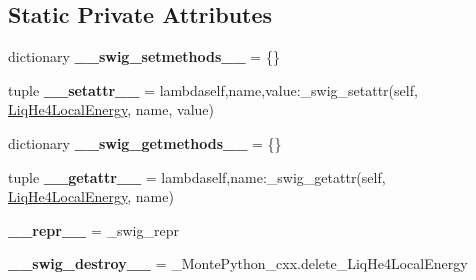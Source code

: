 \subsection*{Static Private Attributes}
\begin{DoxyCompactItemize}
\item 
\hypertarget{classMontePython__cxx_1_1LiqHe4LocalEnergy_a29a3839abb7b7cff3ad52bb3f2b26aa2}{}dictionary {\bfseries \+\_\+\+\_\+swig\+\_\+setmethods\+\_\+\+\_\+} = \{\}\label{classMontePython__cxx_1_1LiqHe4LocalEnergy_a29a3839abb7b7cff3ad52bb3f2b26aa2}

\item 
\hypertarget{classMontePython__cxx_1_1LiqHe4LocalEnergy_a385e831ddfc46d1fbab59eaa501e440a}{}tuple {\bfseries \+\_\+\+\_\+setattr\+\_\+\+\_\+} = lambdaself,name,value\+:\+\_\+swig\+\_\+setattr(self, \hyperlink{classMontePython__cxx_1_1LiqHe4LocalEnergy}{Liq\+He4\+Local\+Energy}, name, value)\label{classMontePython__cxx_1_1LiqHe4LocalEnergy_a385e831ddfc46d1fbab59eaa501e440a}

\item 
\hypertarget{classMontePython__cxx_1_1LiqHe4LocalEnergy_ae9e91890c6a6b360271932fedc95d513}{}dictionary {\bfseries \+\_\+\+\_\+swig\+\_\+getmethods\+\_\+\+\_\+} = \{\}\label{classMontePython__cxx_1_1LiqHe4LocalEnergy_ae9e91890c6a6b360271932fedc95d513}

\item 
\hypertarget{classMontePython__cxx_1_1LiqHe4LocalEnergy_ad371960d2e8ada0536f73448a33e026a}{}tuple {\bfseries \+\_\+\+\_\+getattr\+\_\+\+\_\+} = lambdaself,name\+:\+\_\+swig\+\_\+getattr(self, \hyperlink{classMontePython__cxx_1_1LiqHe4LocalEnergy}{Liq\+He4\+Local\+Energy}, name)\label{classMontePython__cxx_1_1LiqHe4LocalEnergy_ad371960d2e8ada0536f73448a33e026a}

\item 
\hypertarget{classMontePython__cxx_1_1LiqHe4LocalEnergy_a25bc6174136c0301f85e9faacd13f780}{}{\bfseries \+\_\+\+\_\+repr\+\_\+\+\_\+} = \+\_\+swig\+\_\+repr\label{classMontePython__cxx_1_1LiqHe4LocalEnergy_a25bc6174136c0301f85e9faacd13f780}

\item 
\hypertarget{classMontePython__cxx_1_1LiqHe4LocalEnergy_afa92bd3be5bc92a58d9b674ecbe91583}{}{\bfseries \+\_\+\+\_\+swig\+\_\+destroy\+\_\+\+\_\+} = \+\_\+\+Monte\+Python\+\_\+cxx.\+delete\+\_\+\+Liq\+He4\+Local\+Energy\label{classMontePython__cxx_1_1LiqHe4LocalEnergy_afa92bd3be5bc92a58d9b674ecbe91583}

\end{DoxyCompactItemize}


